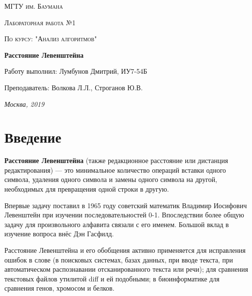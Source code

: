 \documentclass[a4paper,12pt]{report}
\begin{document}
\begin{titlepage}
	\centering
	{\scshape\LARGE МГТУ им. Баумана \par}
	\vspace{4cm}
	{\scshape\Large Лабораторная работа №1\par}
	\vspace{0.5cm}	
	{\scshape\Large По курсу: "Анализ алгоритмов"\par}
	\vspace{2cm}
	{\huge\bfseries Расстояние Левенштейна\par}
	\vspace{3cm}
	\Large Работу выполнил: Лумбунов Дмитрий, ИУ7-54Б\par
	\vspace{0.5cm}
	\Large Преподаватель:  Волкова Л.Л., Строганов Ю.В.\par

	\vfill
	\large \textit {Москва, 2019} \par
\end{titlepage}

\setcounter{page}{2}

\tableofcontents

\newpage
\chapter*{Введение}
\hspace{0.6cm} \textbf{Расстояние Левенштейна} (также редакционное расстояние или дистанция редактирования) — это минимальное количество операций вставки одного символа, удаления одного символа и замены одного символа на другой, необходимых для превращения одной строки в другую.

Впервые задачу поставил в 1965 году советский математик Владимир Иосифович Левенштейн при изучении последовательностей 0-1. Впоследствии более общую задачу для произвольного алфавита связали с его именем. Большой вклад в изучение вопроса внёс Дэн Гасфилд.

Расстояние Левенштейна и его обобщения активно применяется для исправления ошибок в слове (в поисковых системах, базах данных, при вводе текста, при автоматическом распознавании отсканированного текста или речи); для сравнения текстовых файлов утилитой diff и ей подобными; в биоинформатике для сравнения генов, хромосом и белков.
\end{document}
